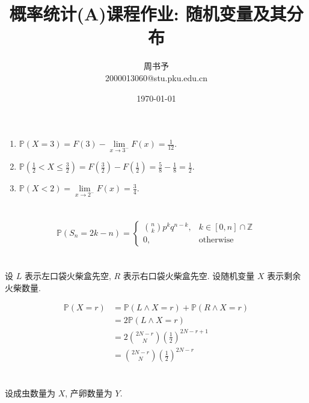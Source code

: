 \documentclass[8pt]{article}
\title{\heiti\zihao{2} 概率统计(A)课程作业: 随机变量及其分布}
\author{\kaishu\zihao{-3} 周书予\\2000013060@stu.pku.edu.cn}
\date{\today}
\theoremstyle{compact}
\def\le{\leqslant}
\def\P#1{\mathbb{P}\left({#1}\right)}
\begin{document}
\pagestyle{fancy}


\maketitle

\section{}
\begin{enumerate}
	\item $\P{X = 3} = F(3) - \lim\limits_{x \to 3^-}F(x) = \frac{1}{12}$.
	\item $\P{\frac12 < X \le \frac32} = F(\frac32) - F(\frac12) = \frac58 - \frac18 = \frac12$.
	\item $\P{X < 2} = \lim\limits_{x \to 2^-}F(x) = \frac34$.
\end{enumerate}

\section{}
\begin{equation}
	\P{S_n = 2k - n} = \begin{cases}
	\binom{n}{k}p^kq^{n-k}, & k \in [0, n] \cap \mathbb Z\\
	0, & \textrm{otherwise}
\end{cases}
\end{equation}

\section{}
设 $L$ 表示左口袋火柴盒先空, $R$ 表示右口袋火柴盒先空. 设随机变量 $X$ 表示剩余火柴数量.

\begin{equation}
\begin{split}
	\P{X = r} &= \P{L \wedge X = r} + \P{R \wedge X = r} \\&= 2\P{L \wedge X = r} \\&= 2\binom{2N-r}{N}\left(\frac12\right)^{2N-r+1} \\&= \binom{2N-r}{N}\left(\frac12\right)^{2N-r}
\end{split}
\end{equation}

\section{}
设成虫数量为 $X$, 产卵数量为 $Y$.
\end{document}
